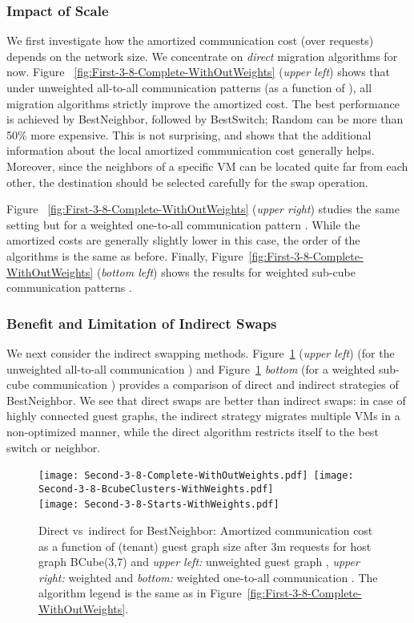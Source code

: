 \documentclass[conference]{IEEEtran}
\def\BC#1#2{BCube(#1,#2)}
\begin{document}
\subsubsection{Impact of Scale}

We first investigate how the amortized communication cost (over  requests) depends on the network size. We concentrate on \emph{direct} migration algorithms
for now.
Figure ~\ref{fig:First-3-8-Complete-WithOutWeights} (\emph{upper left}) shows that under unweighted all-to-all communication patterns  (as a function of ), all migration algorithms strictly improve the
amortized cost. The best performance is achieved by {\sc BestNeighbor}, followed by  {\sc BestSwitch}; {\sc Random} can be more than 50\% more expensive. This is not surprising, and shows that the additional information about the local amortized communication cost generally helps.
Moreover, since the neighbors of a specific VM can be located quite far from each other, the destination should be selected carefully for the swap operation.

Figure ~\ref{fig:First-3-8-Complete-WithOutWeights} (\emph{upper right}) studies the same setting but for a weighted one-to-all communication pattern . While the amortized costs are generally slightly lower in this case, the order of the algorithms is the same as before.
Finally, Figure~\ref{fig:First-3-8-Complete-WithOutWeights} (\emph{bottom left}) shows the results for weighted sub-cube communication patterns .


\subsubsection{Benefit and Limitation of Indirect Swaps}

We next consider the indirect swapping methods. Figure~\ref{fig:Second-3-8-Complete-WithOutWeights} (\emph{upper left}) (for the unweighted all-to-all communication )  and Figure~\ref{fig:Second-3-8-Complete-WithOutWeights} \emph{bottom} (for a weighted sub-cube communication )  provides a comparison of direct and indirect strategies of {\sc BestNeighbor}.
We see that direct swaps are better than indirect swaps: in case of highly connected guest graphs, the indirect strategy
migrates multiple VMs in a non-optimized manner, while the direct algorithm restricts itself to the best switch or neighbor.

	\begin{figure}[h]
				\centering \texttt{[image: Second-3-8-Complete-WithOutWeights.pdf]}~\texttt{[image: Second-3-8-BcubeClusters-WithWeights.pdf]} \\
				\texttt{[image: Second-3-8-Starts-WithWeights.pdf]}~
				\caption{Direct vs~indirect for {\sc BestNeighbor}: Amortized communication cost as a function of (tenant) guest graph size after 3m requests for host graph \BC{3}{7}  and \emph{upper left:} unweighted guest graph , \emph{upper right:}
 weighted  and \emph{bottom:} weighted one-to-all communication . The algorithm legend is the same as in Figure~\ref{fig:First-3-8-Complete-WithOutWeights}.}
				\label{fig:Second-3-8-Complete-WithOutWeights}
				\end{figure}
\end{document}
